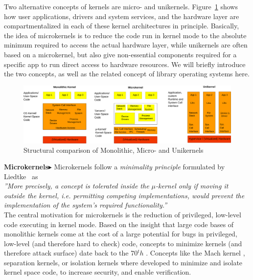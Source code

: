 Two alternative concepts of kernels are micro- and unikernels. Figure~\ref{fig:kernels} shows how user applications, drivers and system services, and the hardware layer are compartmentalized in each of these kernel architectures in principle. Basically, the idea of microkernels is to reduce the code run in kernel mode to the absolute minimum required to access the actual hardware layer, while unikernels are often based on a microkernel, but also give non-essential components required for a specific app to run direct access to hardware resources. We will briefly introduce the two concepts, as well as the related concept of library operating systems here.

\begin{figure}[H]
    \centering
    \includegraphics[scale= 0.36]{figures/kernels.png}
    \caption{Structural comparison of Monolithic, Micro- and Unikernels }
    \label{fig:kernels}
\end{figure}

\textbf{Microkernels$\blacktriangleright$} Microkernels follow a \textit{minimality principle} formulated by Liedtke~\cite{jochen1995mu} as \\

\emph{''More precisely, a concept is tolerated inside the $\mu$-kernel only if moving it outside the kernel, i.e. permitting competing implementations, would prevent the implementation of the system's required functionality.''}\\

The central motivation for microkernels is the reduction of privileged, low-level code executing in kernel mode. Based on the insight that large code bases of monolithic kernels come at the cost of a large potential for bugs in privileged, low-level (and therefore hard to check) code, concepts to minimize kernels (and therefore attack surface) date back to the 70$^th$ \cite{hansen1970nucleus}. Concepts like the Mach kernel \cite{accetta1986mach}, separation kernels\cite{rushby1981design}, or isolation kernels \cite{whitaker2002scale} where developed to minimize and isolate kernel space code, to increase security, and enable verification.  \\

